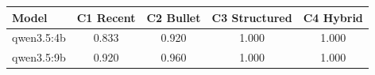 \begin{tabular}{lcccc}
\toprule
Model & C1 Recent & C2 Bullet & C3 Structured & C4 Hybrid \\
\midrule
qwen3.5:4b & 0.833 & 0.920 & 1.000 & 1.000 \\
qwen3.5:9b & 0.920 & 0.960 & 1.000 & 1.000 \\
\bottomrule
\end{tabular}
